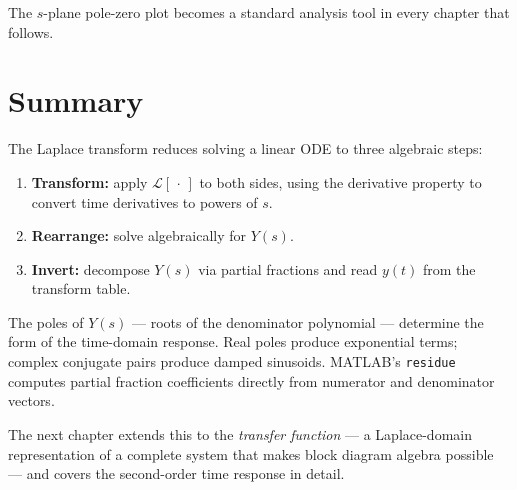\documentclass[../../book.tex]{subfiles}
\begin{document}
The $s$-plane pole-zero plot becomes a standard analysis tool in every chapter
that follows.

\section{Summary}
\label{sec:summary}

The Laplace transform reduces solving a linear ODE to three algebraic steps:
\begin{enumerate}
  \item \textbf{Transform:} apply $\mathcal{L}[\,\cdot\,]$ to both sides, using
    the derivative property to convert time derivatives to powers of $s$.
  \item \textbf{Rearrange:} solve algebraically for $Y(s)$.
  \item \textbf{Invert:} decompose $Y(s)$ via partial fractions and read $y(t)$
    from the transform table.
\end{enumerate}

The poles of $Y(s)$ --- roots of the denominator polynomial --- determine the
form of the time-domain response.  Real poles produce exponential terms;
complex conjugate pairs produce damped sinusoids.  MATLAB's \texttt{residue}
computes partial fraction coefficients directly from numerator and denominator
vectors.

The next chapter extends this to the \emph{transfer function} --- a
Laplace-domain representation of a complete system that makes block diagram
algebra possible --- and covers the second-order time response in detail.
\end{document}
